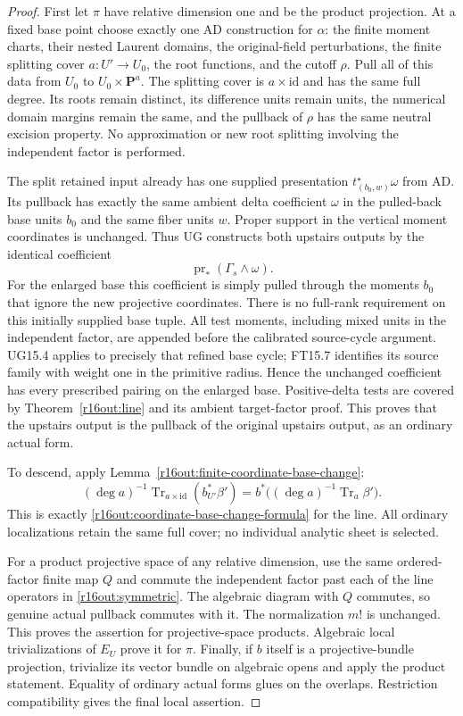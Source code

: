 \begin{proof}
First let $\pi$ have relative dimension one and be the product
projection.  At a fixed base point choose exactly one AD construction
for $\alpha$: the finite moment charts, their nested Laurent domains,
the original-field perturbations, the finite splitting cover
$a:U'\to U_0$, the root functions, and the cutoff $\rho$.
Pull all of this data from $U_0$ to $U_0\times\mathbf P^a$.
The splitting cover is $a\times\mathrm{id}$ and has the same full
degree.  Its roots remain distinct, its difference units remain
units, the numerical domain margins remain the same, and the
pullback of $\rho$ has the same neutral excision property.
No approximation or new root splitting involving the independent
factor is performed.

The split retained input already has one supplied presentation
$t_{(b_0,w)}^\star\omega$ from AD.  Its pullback has exactly the
same ambient delta coefficient $\omega$ in the pulled-back base
units $b_0$ and the same fiber units $w$.  Proper support in the
vertical moment coordinates is unchanged.  Thus UG constructs
both upstairs outputs by the identical coefficient
\[
                 \operatorname{pr}_*(\Gamma_s\wedge\omega).
\]
For the enlarged base this coefficient is simply pulled through
the moments $b_0$ that ignore the new projective coordinates.
There is no full-rank requirement on this initially supplied base
tuple.  All test moments, including mixed units in the independent
factor, are appended before the calibrated source-cycle argument.
UG15.4 applies to precisely that refined base cycle; FT15.7
identifies its source family with weight one in the primitive
radius.  Hence the unchanged coefficient has every prescribed
pairing on the enlarged base.  Positive-delta tests are covered
by Theorem~\ref{r16out:line} and its ambient target-factor proof.
This proves that the upstairs output is the pullback of the
original upstairs output, as an ordinary actual form.

To descend, apply Lemma~\ref{r16out:finite-coordinate-base-change}:
\[
 (\deg a)^{-1}\operatorname{Tr}_{a\times\mathrm{id}}(b_{U'}^*\beta')
   =b^*\bigl((\deg a)^{-1}\operatorname{Tr}_a\beta'\bigr).
\]
This is exactly \eqref{r16out:coordinate-base-change-formula} for
the line.  All ordinary localizations retain the same full cover;
no individual analytic sheet is selected.

For a product projective space of any relative dimension, use the
same ordered-factor finite map $Q$ and commute the independent
factor past each of the line operators in
\eqref{r16out:symmetric}.  The algebraic diagram with $Q$ commutes,
so genuine actual pullback commutes with it.  The normalization
$m!$ is unchanged.  This proves the assertion for projective-space
products.  Algebraic local trivializations of $E_U$ prove it for
$\pi$.  Finally, if $b$ itself is a projective-bundle projection,
trivialize its vector bundle on algebraic opens and apply the
product statement.  Equality of ordinary actual forms glues on
the overlaps.  Restriction compatibility gives the final local
assertion.
\end{proof}

